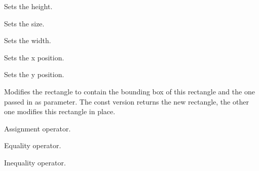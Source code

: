 \label{wxrectsetheight}


Sets the height.


\label{wxrectsetsize}


Sets the size.




\label{wxrectsetwidth}


Sets the width.


\label{wxrectsetx}


Sets the x position.


\label{wxrectsety}


Sets the y position.


\label{wxrectunion}



Modifies the rectangle to contain the bounding box of this rectangle and the
one passed in as parameter. The const version returns the new rectangle, the
other one modifies this rectangle in place.


\label{wxrectassign}


Assignment operator.


\label{wxrectequal}


Equality operator.


\label{wxrectnotequal}


Inequality operator.

